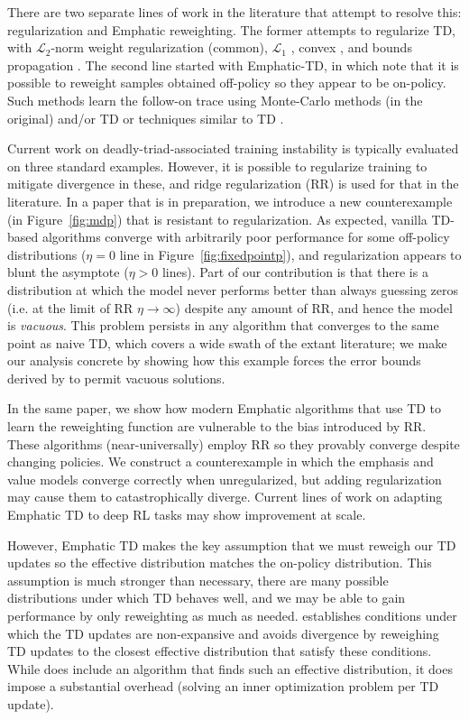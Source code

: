 \documentclass[11pt]{book}
\begin{document}
There are two separate lines of work in the literature that attempt to resolve this: regularization and Emphatic reweighting.
The former attempts to regularize TD, with $\mathcal L_2$-norm weight regularization (common), $\mathcal L_1$ \citep{mahadevan2014proximal}, convex \citep{yu2017convergence}, and bounds propagation \citep{kumar2020discor}.
The second line started with Emphatic-TD, in which \citet{sutton2016emphatic} note that it is possible to reweight samples obtained off-policy so they appear to be on-policy. Such methods learn the follow-on trace using Monte-Carlo methods (in the original) and/or TD \citep{jiang2021learning,zhang2020provably} or techniques similar to TD \citep{hasselt2021expected}.

Current work on deadly-triad-associated training instability is typically evaluated on three standard examples. However, it is possible to regularize training to mitigate divergence in these, and ridge regularization (RR) is used for that in the literature.
In a paper that is in preparation, we introduce a new counterexample (in Figure~\ref{fig:mdp}) that is resistant to regularization. As expected, vanilla TD-based algorithms converge with arbitrarily poor performance for some off-policy distributions ($\eta=0$ line in Figure~\ref{fig:fixedpointp}), and regularization appears to blunt the asymptote ($\eta > 0$ lines). Part of our contribution is that there is a distribution at which the model never performs better than always guessing zeros (i.e. at the limit of RR $\eta\to\infty$) despite any amount of RR, and hence the model is \emph{vacuous}. This problem persists in any algorithm that converges to the same point as naive TD, which covers a wide swath of the extant literature; we make our analysis concrete by showing how this example forces the error bounds derived by \citet{zhang2021breaking} to permit vacuous solutions.

In the same paper, we show how modern Emphatic algorithms that use TD to learn the reweighting function are vulnerable to the bias introduced by RR. These algorithms (near-universally) employ RR so they provably converge despite changing policies. We construct a counterexample in which the emphasis and value models converge correctly when unregularized, but adding regularization may cause them to catastrophically diverge. Current lines of work on adapting Emphatic TD to deep RL tasks \cite{jiang2021emphatic,jiang2022learning} may show improvement at scale.

However, Emphatic TD makes the key assumption that we must reweigh our TD updates so the effective distribution matches the on-policy distribution. This assumption is much stronger than necessary, there are many possible distributions under which TD behaves well, and we may be able to gain performance by only reweighting as much as needed. \citet{kolter2011fixed} establishes  conditions under which the TD updates are non-expansive and avoids divergence by reweighing TD updates to the closest effective distribution that satisfy these conditions. While \cite{kolter2011fixed} does include an algorithm that finds such an effective distribution, it does impose a substantial overhead (solving an inner optimization problem per TD update).
\end{document}
